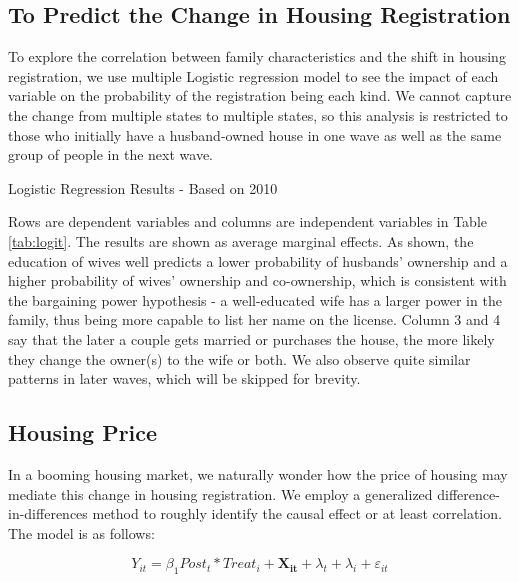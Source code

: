 \documentclass[11pt]{article}
\begin{document}
\subsection{To Predict the Change in Housing Registration}

To explore the correlation between family characteristics and the shift in housing registration, we use multiple Logistic regression model to see the impact of each variable on the probability of the registration being each kind. We cannot capture the change from multiple states to multiple states, so this analysis is restricted to those who initially have a husband-owned house in one wave as well as the same group of people in the next wave. 

\begin{table}[h]
    \centering
    \caption{Logistic Regression Results - Based on 2010}
    \label{tab:logit}
    

\end{table}

Rows are dependent variables and columns are independent variables in Table \ref{tab:logit}. The results are shown as average marginal effects. As shown, the education of wives well predicts a lower probability of husbands' ownership and a higher probability of wives' ownership and co-ownership, which is consistent with the bargaining power hypothesis - a well-educated wife has a larger power in the family, thus being more capable to list her name on the license. Column 3 and 4 say that the later a couple gets married or purchases the house, the more likely they change the owner(s) to the wife or both. We also observe quite similar patterns in later waves, which will be skipped for brevity.



\subsection{Housing Price}

In a booming housing market, we naturally wonder how the price of housing may mediate this change in housing registration. We employ a generalized difference-in-differences method to roughly identify the causal effect or at least correlation. The model is as follows:

\begin{equation*}
    Y_{it} = \beta_1 Post_{t}* Treat_{i} + \mathbf{X_{it}} + \lambda_t + \lambda_i + \varepsilon_{it}
\end{equation*}
\end{document}
